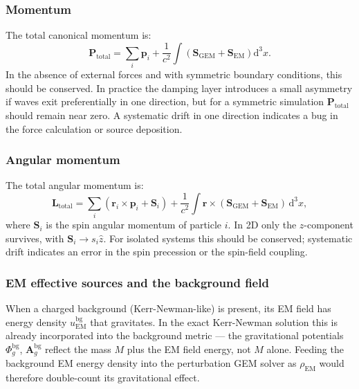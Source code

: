 \documentclass[11pt,a4paper]{article}
\newcommand{\vv}[1]{\mathbf{#1}}
\newcommand{\Phig}{\Phi_g}
\newcommand{\Ag}{\vv{A}_g}
\newcommand{\dd}{\mathrm{d}}
\begin{document}
\subsubsection*{Momentum}

The total canonical momentum is:
\begin{equation}
  \vv{P}_{\mathrm{total}} = \sum_i\vv{p}_i + \frac{1}{c^2}\int\!\!\left(\vv{S}_{\mathrm{GEM}} + \vv{S}_{\mathrm{EM}}\right)\dd^3x.
\end{equation}
In the absence of external forces and with symmetric boundary conditions, this should be conserved.  In practice the damping layer introduces a small asymmetry if waves exit preferentially in one direction, but for a symmetric simulation $\vv{P}_{\mathrm{total}}$ should remain near zero.  A systematic drift in one direction indicates a bug in the force calculation or source deposition.

\subsubsection*{Angular momentum}

The total angular momentum is:
\begin{equation}
  \vv{L}_{\mathrm{total}} = \sum_i\!\left(\vv{r}_i\times\vv{p}_i + \vv{S}_i\right) + \frac{1}{c^2}\int\vv{r}\times(\vv{S}_{\mathrm{GEM}}+\vv{S}_{\mathrm{EM}})\,\dd^3x,
\end{equation}
where $\vv{S}_i$ is the spin angular momentum of particle $i$.  In 2D only the $z$-component survives, with $\vv{S}_i \to s_i\hat{z}$.  For isolated systems this should be conserved; systematic drift indicates an error in the spin precession or the spin-field coupling.

\subsubsection*{EM effective sources and the background field}

When a charged background (Kerr-Newman-like) is present, its EM field has energy density $u_{\mathrm{EM}}^{\mathrm{bg}}$ that gravitates.  In the exact Kerr-Newman solution this is already incorporated into the background metric --- the gravitational potentials $\Phig^{\mathrm{bg}}$, $\Ag^{\mathrm{bg}}$ reflect the mass $M$ plus the EM field energy, not $M$ alone.  Feeding the background EM energy density into the perturbation GEM solver as $\rho_{\mathrm{EM}}$ would therefore double-count its gravitational effect.
\end{document}
